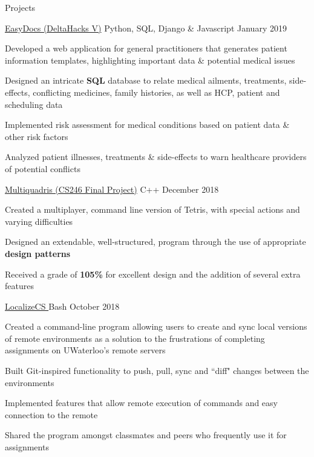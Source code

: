 \documentclass{resume} %
\begin{document}
\begin{rSection}{Projects}
    
    \begin{sideproject}
        {\href{https://github.com/wbhildeb/EasyDocs}{\faGithub{} EasyDocs (DeltaHacks V)}}
        {Python, SQL, Django \& Javascript}
        {January 2019}
        {
            \item Developed a web application for general practitioners that generates patient information templates, highlighting important data \& potential medical issues
            \item Designed an intricate \textbf{SQL} database to relate medical ailments, treatments, side-effects, conflicting medicines, family histories, as well as HCP, patient and scheduling data
            \item Implemented risk assessment for medical conditions based on patient data \& other risk factors
            \item Analyzed patient illnesses, treatments \& side-effects to warn healthcare providers of potential conflicts
        }
    \end{sideproject}

    \vspace{1em}

    \begin{sideproject}
        {\href{https://github.com/wbhildeb/Multiquadris}{\faGithub{} Multiquadris (CS246 Final Project)}}
        {C++}
        {December 2018}
        {
            \item Created a multiplayer, command line version of Tetris, with special actions and varying difficulties
            \item Designed an extendable, well-structured, program through the use of appropriate \textbf{design patterns}
            \item Received a grade of \textbf{105\%} for excellent design and the addition of several extra features
        }
    \end{sideproject}
    
    \vspace{1em}

    \begin{sideproject}
        {\href{https://github.com/wbhildeb/localize-cs}{\faGithub{} LocalizeCS }}
        {Bash}
        {October 2018}
        {
            \item Created a command-line program allowing users to create and sync local versions of remote environments as
            a solution to the frustrations of completing assignments on UWaterloo's remote servers
            \item Built Git-inspired functionality to push, pull, sync and ``diff" changes between the environments
            \item Implemented features that allow remote execution of commands and easy connection to the remote
            \item Shared the program amongst classmates and peers who frequently use it for assignments
        }
    \end{sideproject}
    

\end{rSection}
\end{document}
